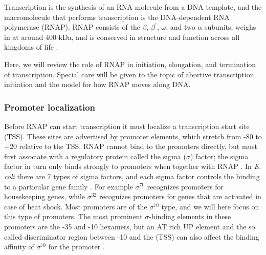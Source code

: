 %
Transcription is the synthesis of an RNA molecule from a DNA template, and the
macromolecule that performs transcription is the DNA-dependent RNA polymerase
(RNAP). RNAP consists of the $\beta$, $\beta^{\prime}$, $\omega$, and two
$\alpha$ subunits, weighs in at around 400 kDa, and is conserved in structure
and function across all kingdoms of life \cite{borukhov_rna_2008}.

Here, we will review the role of RNAP in initiation, elongation, and
termination of transcription. Special care will be given to the topic of
abortive transcription initiation and the model for how RNAP moves along DNA.

\subsubsection{Promoter localization}
Before RNAP can start transcription it must localize a transcription start site
(TSS). These sites are advertised by promoter elements, which stretch from -80
to +20 relative to the TSS. RNAP cannot bind to the promoters directly, but
must first associate with a regulatory protein called the sigma ($\sigma$)
factor; the sigma factor in turn only binds strongly to promoters when together
with RNAP \cite{paget_70_2003}. In \textit{E. coli} there are 7 types of sigma
factors, and each sigma factor controls the binding to a particular gene family
\cite{osterberg_regulation_2011}. For example $\sigma^{70}$ recognizes
promoters for housekeeping genes, while $\sigma^{32}$ recognizes promoters for
genes that are activated in case of heat shock. Most promoters are of the
$\sigma^{70}$ type, and we will here focus on this type of promoters. The most
prominent $\sigma$-binding elements in these promoters are the -35 and -10
hexamers, but an AT rich UP element and the so called discriminator region
between -10 and the (TSS) can also affect the binding affinity of $\sigma^{70}$
for the promoter \cite{ross_third_1993, haugen_fine_2008}.

